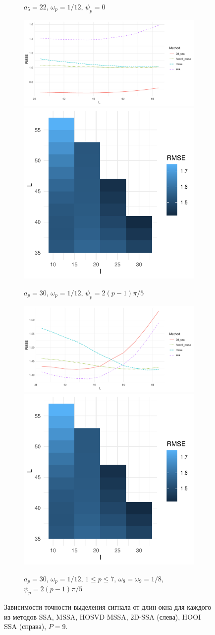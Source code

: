 \documentclass[specialist,
    substylefile = spbu_report.rtx,
    subf,href,colorlinks=true, 12pt]{disser}
\theoremstyle{plain}
\theoremstyle{definition}
\theoremstyle{remark}
\begin{document}
\begin{figure}
\begin{subfigure}{.95\linewidth}
{                $a_5=22$, $\omega_p=1/12$, $\psi_p=0$}
        \end{subfigure} \par\medskip
        \begin{subfigure}{.95\linewidth}
            \includegraphics[width=.66\linewidth]{nine-series-third}\hfill
            \includegraphics[width=.34\linewidth]{nine-series-third_hooi}
            \caption{$a_p = 30$, $\omega_p=1/12$, $\psi_p=2(p-1)\pi/5$}
        \end{subfigure} \par\medskip
        \begin{subfigure}{.95\linewidth}
            \includegraphics[width=.66\linewidth]{nine-series-fourth}\hfill
            \includegraphics[width=.34\linewidth]{nine-series-fourth_hooi}
            \caption{$a_p = 30$, $\omega_p=1/12$, $1 \leqslant p \leqslant 7$,
                $\omega_8=\omega_9=1/8$, $\psi_p=2(p-1)\pi/5$}
        \end{subfigure}
        \caption{Зависимости точности выделения сигнала от длин окна для каждого из методов
        SSA, MSSA, HOSVD MSSA, 2D-SSA (слева), HOOI SSA (справа), $P=9$.}
        \label{fig:nine-series-example}
    \end{figure}
\end{document}

